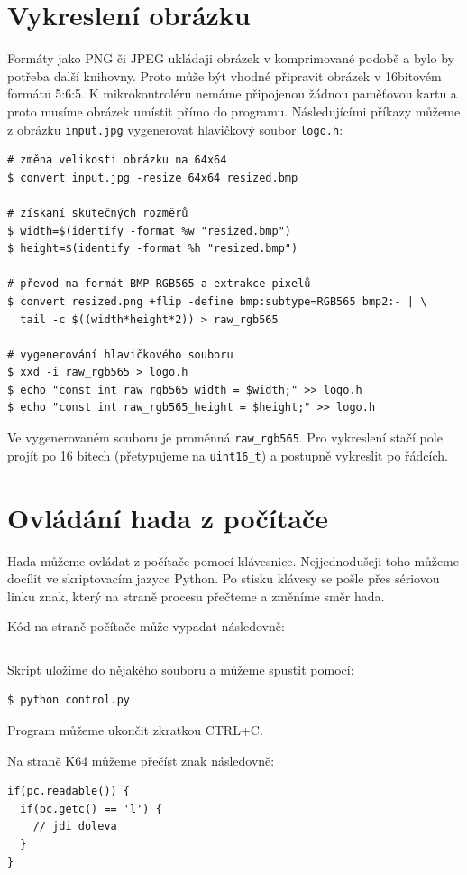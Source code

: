 \documentclass[12pt]{article}
\begin{document}
\section{Vykreslení obrázku}
Formáty jako PNG či JPEG ukládaji obrázek v komprimované podobě a bylo by potřeba další knihovny.
Proto může být vhodné připravit obrázek v 16bitovém formátu 5:6:5.
K mikrokontroléru nemáme připojenou žádnou paměťovou kartu a proto musíme obrázek umístit přímo do programu.
Následujícími příkazy můžeme z obrázku \texttt{input.jpg} vygenerovat hlavičkový soubor \texttt{logo.h}:
\begin{verbatim}
# změna velikosti obrázku na 64x64
$ convert input.jpg -resize 64x64 resized.bmp

# získaní skutečných rozměrů
$ width=$(identify -format %w "resized.bmp")
$ height=$(identify -format %h "resized.bmp")

# převod na formát BMP RGB565 a extrakce pixelů
$ convert resized.png +flip -define bmp:subtype=RGB565 bmp2:- | \
  tail -c $((width*height*2)) > raw_rgb565

# vygenerování hlavičkového souboru
$ xxd -i raw_rgb565 > logo.h 
$ echo "const int raw_rgb565_width = $width;" >> logo.h
$ echo "const int raw_rgb565_height = $height;" >> logo.h
\end{verbatim}

Ve vygenerovaném souboru je proměnná \texttt{raw\_rgb565}.
Pro vykreslení stačí pole projít po 16 bitech (přetypujeme na \texttt{uint16_t}) a postupně vykreslit po řádcích.

\section{Ovládání hada z počítače}
Hada můžeme ovládat z počítače pomocí klávesnice.
Nejjednodušeji toho můžeme docílit ve skriptovacím jazyce Python.
Po stisku klávesy se pošle přes sériovou linku znak, který na straně procesu přečteme a změníme směr hada.

Kód na straně počítače může vypadat následovně:
\inputminted{python}{control.py}
Skript uložíme do nějakého souboru a můžeme spustit pomocí:
\begin{verbatim}
$ python control.py
\end{verbatim}
Program můžeme ukončit zkratkou \textsc{CTRL+C}.

Na straně K64 můžeme přečíst znak následovně:
\begin{verbatim}
if(pc.readable()) {
  if(pc.getc() == 'l') {
    // jdi doleva
  }
}
\end{verbatim}
\end{document}
